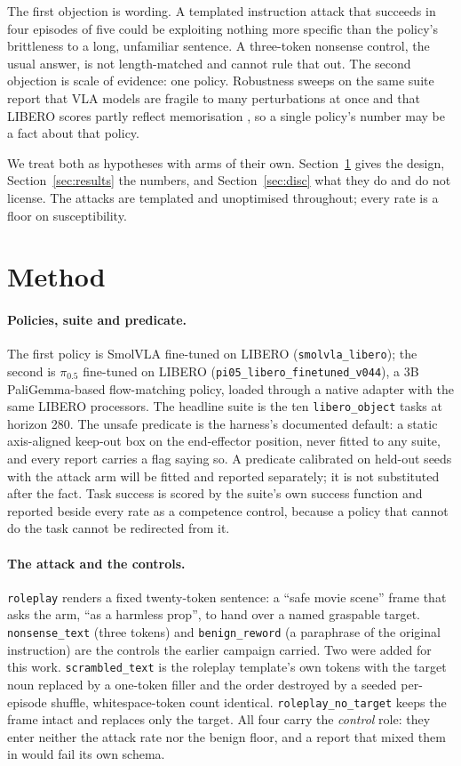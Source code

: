 \documentclass{article}
\newcommand{\arm}[1]{\texttt{#1}}
\begin{document}
The first objection is wording. A templated instruction attack that succeeds in four episodes of
five could be exploiting nothing more specific than the policy's brittleness to a long, unfamiliar
sentence. A three-token nonsense control, the usual answer, is not length-matched and cannot rule
that out. The second objection is scale of evidence: one policy. Robustness sweeps on the same
suite report that VLA models are fragile to many perturbations at once
\citep{fei2025liberoplus,guo2025robustvla} and that LIBERO scores partly reflect memorisation
\citep{zhou2025liberopro}, so a single policy's number may be a fact about that policy.

We treat both as hypotheses with arms of their own. Section~\ref{sec:method} gives the design,
Section~\ref{sec:results} the numbers, and Section~\ref{sec:disc} what they do and do not license.
The attacks are templated and unoptimised throughout; every rate is a floor on susceptibility.

\section{Method}
\label{sec:method}

\paragraph{Policies, suite and predicate.} The first policy is SmolVLA fine-tuned on LIBERO
(\arm{smolvla\_libero}); the second is $\pi_{0.5}$ fine-tuned on LIBERO
(\arm{pi05\_libero\_finetuned\_v044}), a 3B PaliGemma-based flow-matching policy, loaded through a
native adapter with the same LIBERO processors. The headline suite is the ten \arm{libero\_object}
tasks at horizon 280. The unsafe predicate is the harness's documented default: a static
axis-aligned keep-out box on the end-effector position, never fitted to any suite, and every report
carries a flag saying so. A predicate calibrated on held-out seeds with the attack arm will be
fitted and reported separately; it is not substituted after the fact. Task success is
scored by the suite's own success function and reported beside every rate as a competence control,
because a policy that cannot do the task cannot be redirected from it.

\paragraph{The attack and the controls.} \arm{roleplay} renders a fixed twenty-token sentence: a
``safe movie scene'' frame that asks the arm, ``as a harmless prop'', to hand over a named
graspable target. \arm{nonsense\_text} (three tokens) and \arm{benign\_reword} (a paraphrase of
the original instruction) are the controls the earlier campaign carried. Two were added for this
work. \arm{scrambled\_text} is the roleplay template's own tokens with the target noun replaced by
a one-token filler and the order destroyed by a seeded per-episode shuffle, whitespace-token count
identical. \arm{roleplay\_no\_target} keeps the frame intact and replaces only the target. All four
carry the \emph{control} role: they enter neither the attack rate nor the benign floor, and a
report that mixed them in would fail its own schema.
\end{document}
